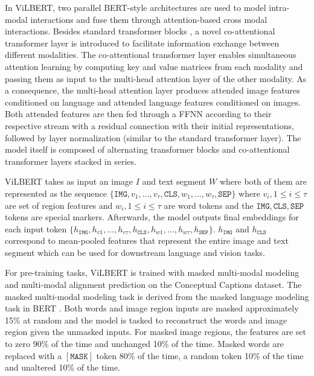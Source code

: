 \documentclass{article}
\begin{document}
In ViLBERT, two parallel BERT-style architectures are used to model intra-modal interactions and fuse them through attention-based cross modal interactions. Besides standard transformer blocks \citep{transformers}, a novel co-attentional transformer layer is introduced to facilitate information exchange between different modalities. The co-attentional transformer layer enables simultaneous attention learning by computing key and value matrices from each modality and passing them as input to the multi-head attention layer of the other modality. As a consequence, the multi-head attention layer produces attended image features conditioned on language and attended language features conditioned on images. Both attended features are then fed through a FFNN according to their respective stream with a residual connection with their initial representations, followed by layer normalization (similar to the standard transformer layer). The model itself is composed of alternating transformer blocks and co-attentional transformer layers stacked in series. 

ViLBERT takes as input an image $I$ and text segment $W$ where both of them are represented as the sequence $\{\mathtt{IMG}, v_{1}, \dots, v_{\tau}, \mathtt{CLS}, w_{1}, \dots, w_{\tau}, \mathtt{SEP}\}$ where $v_{i}, 1 \leq i \leq \tau$ are set of region features and $w_{i}, 1 \leq i \leq \tau$ are word tokens and the $\mathtt{IMG, CLS, SEP}$ tokens are special markers. Afterwards, the model outputs final embeddings for each input token $\{h_{\mathtt{IMG}}, h_{v1}, \dots, h_{v \tau}, h_{\mathtt{CLS}}, h_{w1}, \dots, h_{w \tau}, h_{\mathtt{SEP}}\}$. $h_{\mathtt{IMG}}$ and $h_{\mathtt{CLS}}$ correspond to mean-pooled features that represent the entire image and text segment which can be used for downstream language and vision tasks.

For pre-training tasks, ViLBERT is trained with masked multi-modal modeling and multi-modal alignment prediction on the Conceptual Captions \citep{sharma-etal-2018-conceptual} dataset. The masked multi-modal modeling task is derived from the masked language modeling task in BERT \citep{devlin-etal-2019-bert}. Both words and image region inputs are masked approximately 15\% at random and the model is tasked to reconstruct the words and image region given the unmasked inputs. For masked image regions, the features are set to zero 90\% of the time and unchanged 10\% of the time. Masked words are replaced with a $[\mathtt{MASK}]$ token 80\% of the time, a random token 10\% of the time and unaltered 10\% of the time. 
\end{document}
